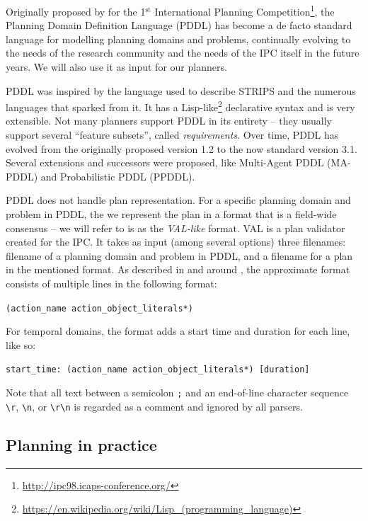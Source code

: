 Originally proposed by \citet{McDermott1998} for the 1$^{\mathrm{st}}$ International Planning
Competition\footnote{\url{http://ipc98.icaps-conference.org/}},
the Planning Domain Definition Language (PDDL) has become
a de facto standard language for modelling planning domains and problems,
continually evolving to the needs of the  
research community and the needs of the IPC itself in the future years.
We will also use it as input for our planners.

PDDL was inspired by the language used to describe STRIPS \citep{Fikes1971}
and the numerous languages that sparked from it.
It has a Lisp-like\footnote{\url{https://en.wikipedia.org/wiki/Lisp_(programming_language)}}
declarative syntax and is very extensible.
Not many planners support PDDL in its entirety -- they usually support 
several ``feature subsets'', called \textit{requirements}.
Over time, PDDL has evolved from the originally proposed version 1.2
to the now standard version 3.1. Several extensions and successors were proposed,
like Multi-Agent PDDL
(MA-PDDL) and
Probabilistic PDDL
(PPDDL).

PDDL does not handle plan representation. For a specific planning domain and problem in PDDL,
the we represent the plan in a format that is a field-wide consensus -- we will refer to is
as the \textit{VAL-like} format. VAL \citep{Howey2003} is a plan validator created for the IPC.
It takes as input (among several options) three filenames: filename of a planning domain and
problem in PDDL, and a filename for a plan in the mentioned format.
As described in and around \citet[Figure~2]{Howey2003}, the approximate format
consists of multiple lines in the following format:
\begin{center}
\verb+(action_name action_object_literals*)+
\end{center}

For temporal domains, the format adds a start time and duration for each line, like so:
\begin{center}
\verb+start_time: (action_name action_object_literals*) [duration]+
\end{center}

Note that all text between a semicolon \verb+;+ and an end-of-line character sequence \verb+\r+, \verb+\n+, or \verb+\r\n+ is regarded as a comment and ignored by all parsers.

\subsection{Planning in practice}

